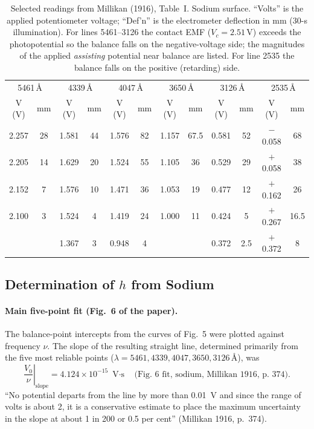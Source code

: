 \documentclass[12pt]{article}
\begin{document}
\begin{table}[ht]
\centering
\caption{Selected readings from Millikan (1916), Table~I.  Sodium surface.
``Volts'' is the applied potentiometer voltage; ``Def'n'' is the
electrometer deflection in mm (30-s illumination).  For lines 5461--3126
the contact EMF ($V_c = 2.51$\,V) exceeds the photopotential so the
balance falls on the negative-voltage side; the magnitudes of the applied
\emph{assisting} potential near balance are listed.  For line 2535 the
balance falls on the positive (retarding) side.}
\label{tab:millikan_raw}
\begin{tabular}{cc|cc|cc|cc|cc|cc}
\toprule
\multicolumn{2}{c|}{5461\,\AA} &
\multicolumn{2}{c|}{4339\,\AA} &
\multicolumn{2}{c|}{4047\,\AA} &
\multicolumn{2}{c|}{3650\,\AA} &
\multicolumn{2}{c|}{3126\,\AA} &
\multicolumn{2}{c}{2535\,\AA} \\
V (V) & mm & V (V) & mm & V (V) & mm & V (V) & mm & V (V) & mm & V (V) & mm \\
\midrule
2.257 & 28 & 1.581 & 44 & 1.576 & 82 & 1.157 & 67.5 & 0.581 & 52 & $-$0.058 & 68 \\
2.205 & 14 & 1.629 & 20 & 1.524 & 55 & 1.105 & 36   & 0.529 & 29 & $+$0.058 & 38 \\
2.152 &  7 & 1.576 & 10 & 1.471 & 36 & 1.053 & 19   & 0.477 & 12 & $+$0.162 & 26 \\
2.100 &  3 & 1.524 &  4 & 1.419 & 24 & 1.000 & 11   & 0.424 &  5 & $+$0.267 & 16.5\\
      &   & 1.367 &  3 & 0.948 &  4 &       &      & 0.372 & 2.5& $+$0.372 &  8 \\
\bottomrule
\end{tabular}
\end{table}

\subsection{Determination of \texorpdfstring{$h$}{h} from Sodium}

\paragraph{Main five-point fit (Fig.\ 6 of the paper).}
The balance-point intercepts from the curves of Fig.\ 5 were plotted
against frequency $\nu$.  The slope of the resulting straight line,
determined primarily from the five most reliable points
($\lambda = 5461, 4339, 4047, 3650, 3126$\,\AA), was
\[
  \left.\frac{V_0}{\nu}\right|_{\text{slope}} =
  4.124 \times 10^{-15}\text{ V$\cdot$s}
  \quad \text{(Fig.\ 6 fit, sodium, Millikan 1916, p.\ 374).}
\]
``No potential departs from the line by more than 0.01~V and since the
range of volts is about 2, it is a conservative estimate to place the
maximum uncertainty in the slope at about 1 in 200 or 0.5 per cent''
(Millikan 1916, p.\ 374).
\end{document}
